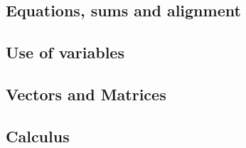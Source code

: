 \subsection{Equations, sums and alignment}
\subsection{Use of variables} %
\subsection{Vectors and Matrices}
\subsection{Calculus}